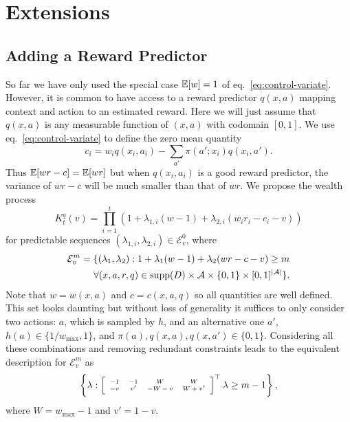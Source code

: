\section{Extensions}

\subsection{Adding a Reward Predictor}
\label{sec:reward-predictor}
So far we have only used the special case $\mathbb{E}[w]=1$ of
eq.~\eqref{eq:control-variate}. However, it is common to have access to a
reward predictor $q(x,a)$ mapping context and action to an estimated reward.
Here we will just assume that $q(x,a)$ is any measurable function of $(x,a)$
with codomain $[0,1]$. We use eq.~\eqref{eq:control-variate} to define the 
zero mean quantity
\begin{equation}
c_i=w_i q(x_i,a_i)-\sum_{a'}\pi(a';x_i)q(x_i,a').    
\label{eq:ci-defn}
\end{equation}
Thus $\mathbb{E}[wr-c]=\mathbb{E}[wr]$ but when $q(x_i, a_i)$ is a good 
reward predictor, the variance of $wr - c$ will be much 
smaller than that of $wr$. We propose the wealth process
\[
K_t^q(v)=\prod_{i=1}^{t}\left(1+\lambda_{1,i} (w-1)+\lambda_{2,i}(w_i r_i-c_i-v)\right)
\]
for predictable sequences 
$(\lambda_{1,i}, \lambda_{2,i}) \in \mathcal{E}_{v}^0$, where
\begin{align*}
\mathcal{E}_v^{m} =
\{(\lambda_1,\lambda_2):  1+\lambda_1(w-1)+\lambda_2(wr-c-v)\geq m \notag\\
\forall (x,a,r,q) \in \operatorname{supp}(D) \times \mathcal{A} \times \{0,1\} \times [0,1]^{|\mathcal{A}|}
\}.
\end{align*}
Note that $w=w(x, a)$ and $c=c(x,a,q)$ so all quantities are well defined.
This set looks daunting but without loss of generality it suffices to
only consider two 
actions: $a$, which is sampled by $h$, and an alternative one $a'$,
$h(a) \in \{1/w_{\max},1\}$, and $\pi(a),q(x,a),q(x,a') \in \{0,1\}$.
Considering all these combinations and removing redundant constraints 
leads to the equivalent description for $\mathcal{E}_v^{m}$ as
\begin{align}
\tiny
\left\{\lambda:  
\left[\begin{array}{cccc}
-1 & -1 & W & W \\ 
-v & v' & -W-v & W+v'
\end{array}\right]^\top
\lambda \geq m - 1 \label{eq:rp-explicit-domain}
\right\},
\end{align}
where $W = w_{\max}-1$ and $v'=1-v$.

